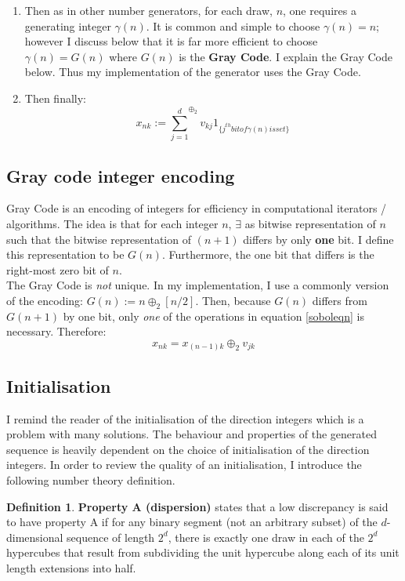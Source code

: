 \documentclass{report}
\theoremstyle{plain}
\theoremstyle{definition}
\newtheorem{defn}[thm]{Definition} %
\begin{document}
\begin{enumerate}
	\item Then as in other number generators, for each draw, $n$, one requires a generating integer $\gamma(n)$. It is common and simple to choose $\gamma(n) = n$; however I discuss below that it is far more efficient to choose $\gamma(n) = G(n)$ where $G(n)$ is the \textbf{Gray Code}. I explain the Gray Code below. Thus my implementation of the generator uses the Gray Code.
	\item Then finally: 
	\begin{equation}
	\label{soboleqn}
	x_{nk} := {\sum_{j=1}^{d}}^{\oplus_2} v_{kj}\mathcal{1}_{\{j^{th} bit of \gamma(n) is set\}}
	\end{equation}
\end{enumerate}

\subsection{Gray code integer encoding}

Gray Code is an encoding of integers for efficiency in computational iterators / algorithms. The idea is that for each integer $n$, $\exists$ as bitwise representation of $n$ such that the bitwise representation of $(n+1)$ differs by only \textbf{one} bit. I define this representation to be $G(n)$. Furthermore, the one bit that differs is the right-most zero bit of $n$. \\

The Gray Code is \emph{not} unique. In my implementation, I use a commonly version of the encoding: $G(n) := n \oplus_2 [n/2]$. Then, because $G(n)$ differs from $G(n+1)$ by one bit, only \emph{one} of the operations in equation \ref{soboleqn} is necessary. Therefore: $$ x_{nk} = x_{(n-1)k} \oplus_2 v_{jk}$$

\subsection{Initialisation}

I remind the reader of the initialisation of the direction integers which is a problem with many solutions. The behaviour and properties of the generated sequence is heavily dependent on the choice of initialisation of the direction integers. In order to review the quality of an initialisation, I introduce the following number theory definition.

\begin{defn}
	\textbf{Property A (dispersion)} states that a low discrepancy is said to have property A if for any binary segment (not an arbitrary subset) of the $d$-dimensional sequence of length $2^d$, there is exactly one draw in each of the $2^d$ hypercubes that result from subdividing the unit hypercube along each of its unit length extensions into half.
\end{defn}
\end{document}

